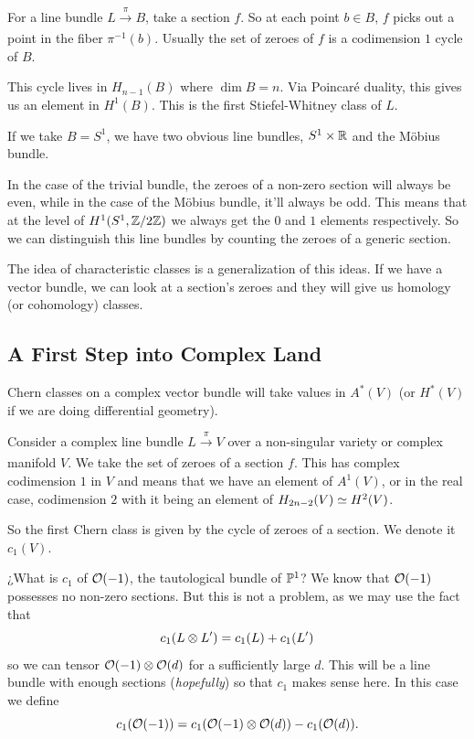 \documentclass[12pt]{memoir}
\begin{document}
\begin{Ex}
    For a line bundle $L\xrightarrow[]{\pi}B$, take a section $f$. So at each point $b\in B$, $f$ picks out a point in the fiber $\pi^{-1}(b)$. Usually the set of zeroes of $f$ is a codimension $1$ cycle of $B$.
    \begin{center}
    \end{center}
    This cycle lives in $H_{n-1}(B)$ where $\dim B=n$. Via Poincaré duality, this gives us an element in $H^1(B)$. This is the first Stiefel-Whitney class of $L$.\par
    If we take $B=S^1$, we have two obvious line bundles, $S^1\times\mathbb{R}$ and the Möbius bundle. 
    \begin{center}
    \end{center}
    In the case of the trivial bundle, the zeroes of a non-zero section will always be even, while in the case of the Möbius bundle, it'll always be odd. This means that at the level of $H^{1}(S^1,\mathbb{Z}/2\mathbb{Z})$ we always get the $0$ and $1$ elements respectively. So we can distinguish this line bundles by counting the zeroes of a generic section.
\end{Ex}

The idea of characteristic classes is a generalization of this ideas. If we have a vector bundle, we can look at a section's zeroes and they will give us homology (or cohomology) classes.

\subsection{A First Step into Complex Land}

Chern classes on a complex vector bundle will take values in $A^*(V)$ (or $H^\ast(V)$ if we are doing differential geometry).\par
Consider a complex line bundle $L\xrightarrow[]{\pi}V$ over a non-singular variety or complex manifold $V$. We take the set of zeroes of a section $f$. This has complex codimension $1$ in $V$ and means that we have an element of $A^1(V)$, or in the real case, codimension $2$ with it being an element of $H_{2n-2}(V)\simeq H^2(V)$.\par 
So the first Chern class is given by the cycle of zeroes of a section. We denote it $c_1(V)$.

\begin{Ex}
    ¿What is $c_1$ of $\mathcal{O}(-1)$, the tautological bundle of $\mathbb{P}^1$? We know that $\mathcal{O}(-1)$ possesses no non-zero sections. But this is not a problem, as we may use the fact that 
    $$c_1(L\otimes L')=c_1(L)+c_1(L')$$
    so we can tensor $\mathcal{O}(-1)\otimes\mathcal{O}(d)$ for a sufficiently large $d$. This will be a line bundle with enough sections (\emph{hopefully}) so that $c_1$ makes sense here. In this case we define 
    $$c_1(\mathcal{O}(-1))=c_1(\mathcal{O}(-1)\otimes\mathcal{O}(d))-c_1(\mathcal{O}(d)).$$
\end{Ex}
\end{document}
